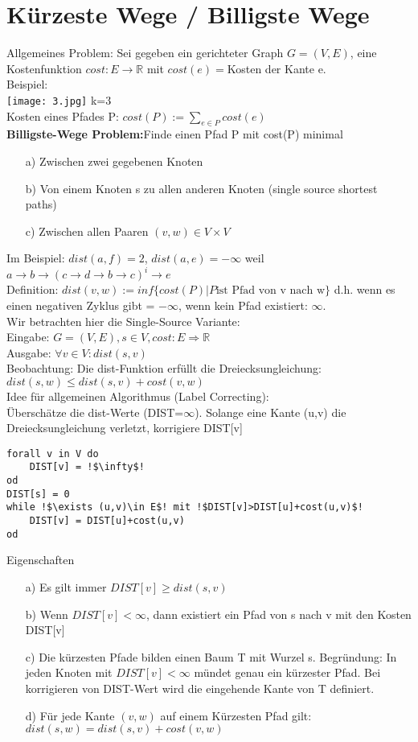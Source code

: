 \documentclass[a4paper]{article}
\begin{document}
\section{Kürzeste Wege / Billigste Wege}
Allgemeines Problem: Sei gegeben ein gerichteter Graph $G=(V,E)$, eine Kostenfunktion $cost:E\rightarrow \mathbb{R}$ mit $cost(e)=$Kosten der Kante e.\\
Beispiel:\\
\texttt{[image: 3.jpg]} k=3\\
Kosten eines Pfades P: $cost(P):= \sum_{e\in P} cost(e)$\\
\textbf{Billigste-Wege Problem:}Finde einen Pfad P mit cost(P) minimal
\begin{itemize}
\item[a)] Zwischen zwei gegebenen Knoten
\item[b)] Von einem Knoten s zu allen anderen Knoten (single source shortest paths)
\item[c)] Zwischen allen Paaren $(v,w)\in V\times V$
\end{itemize}
Im Beispiel: $dist(a,f) = 2$, $dist(a,e) = -\infty$ weil $a\rightarrow b \rightarrow (c\rightarrow d\rightarrow b\rightarrow c)^i \rightarrow e$\\
Definition: $dist(v,w) := inf\lbrace cost(P)|P \text{ist Pfad von v nach w}\rbrace$ d.h. wenn es einen negativen Zyklus gibt = $-\infty$, wenn kein Pfad existiert: $\infty$.\\
Wir betrachten hier die Single-Source Variante:\\
Eingabe: $G=(V,E), s\in V, cost:E\Rightarrow\mathbb{R}$\\
Ausgabe: $\forall v\in V: dist(s,v)$\\
Beobachtung: Die dist-Funktion erfüllt die Dreiecksungleichung: $dist(s,w)\leq dist(s,v)+cost(v,w)$\\
Idee für allgemeinen Algorithmus (Label Correcting):\\
Überschätze die dist-Werte (DIST=$\infty$). Solange eine Kante (u,v) die Dreiecksungleichung verletzt, korrigiere DIST[v]\\
\begin{lstlisting}[escapechar=!]
forall v in V do
	DIST[v] = !$\infty$!
od
DIST[s] = 0
while !$\exists (u,v)\in E$! mit !$DIST[v]>DIST[u]+cost(u,v)$!
	DIST[v] = DIST[u]+cost(u,v)
od
\end{lstlisting}
Eigenschaften
\begin{itemize}
\item[a)] Es gilt immer $DIST[v] \geq dist(s,v)$
\item[b)] Wenn $DIST[v] < \infty$, dann existiert ein Pfad von s nach v mit den Kosten DIST[v]
\item[c)] Die kürzesten Pfade bilden einen Baum T mit Wurzel s. Begründung: In jeden Knoten mit $DIST[v] < \infty$ mündet genau ein kürzester Pfad. Bei korrigieren von DIST-Wert wird die eingehende Kante von T definiert.
\item[d)] Für jede Kante $(v,w)$ auf einem Kürzesten Pfad gilt: $dist(s,w) = dist(s,v)+cost(v,w)$
\end{itemize}
\end{document}
